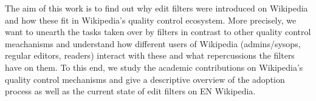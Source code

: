 The aim of this work is to find out why edit filters were introduced on Wikipedia and how these fit in Wikipedia's quality control ecosystem.
More precisely, we want to unearth the tasks taken over by filters in contrast to other quality control meachanisms
and understand how different users of Wikipedia (admins/sysops, regular editors, readers) interact with these and what repercussions the filters have on them.
To this end, we study the academic contributions on Wikipedia's quality control mechanisms and give a descriptive overview of the adoption process as well as the current state of edit filters on EN Wikipedia.


\begin{comment}
# Motivation

* What is the role of filters among existing (algorithmic) quality-control mechanisms (bots, semi-automated tools, ORES, humans)?  Which type of tasks do filters take over? - chapter 4
* How have these tasks evolved over time (are there changes in the type, number, etc.)? - chapter 5
* What are suitable areas of application for rule-based systems such as filters in contrast to the other ML-based approaches? - discussion

Questions from Confluence
  Q1 We wanted to improve our understanding of the role of filters in existing algorithmic quality-control mechanisms (bots, ORES, humans).
  Q2 Which type of tasks do these filters take over in comparison to the other mechanisms? How these tasks evolve over time (are they changes in the type, number, etc.)?
  Q3 Since filters are classical rule-based systems, what are suitable areas of application for such rule-based system in contrast to the other ML-based approaches.

Note:
* to answer the question about evolution over time, I really do need the abuse_filter_history table
* modify 3rd question to: why are regexes still there when we have ML; answering it most probably involves talking to people
* check what questions the first bot papers asked, may serve as inspiration

\begin{itemize}
	\item Was sind die mit dieser Arbeit verfolgten Ziele? Welches Problem soll gelöst werden?
	\item Eine Beschreibung der ersten Ideen, der vorgeschlagene Ansatz und die aktuell erreichten Resultate
	\item Eine Beschreibung, welchen Beitrag die Arbeit leistet, um das vorgestellte Problem zu lösen
	\item Eine Diskussion, wie die vorgeschlagene Lösung sich von bestehenden unterscheidet, was ist neu oder besser?
\end{itemize}


\end{comment}
